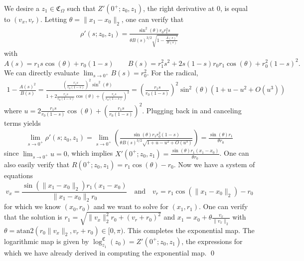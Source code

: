 \documentclass[11pt]{article}
\begin{document}
We desire a $z_1 \in \mathfrak{C}_\Omega$ such that $Z'(0^+; z_0, z_1)$, the right derivative at $0$, is equal to $(v_x, v_r).$ Letting $\theta = \|x_1 - x_0\|_2$, one can verify that 
\begin{align*}
    \rho'(s; z_0, z_1) = \frac{\sin^2(\theta)r_0r_1^2s}{\theta B(s)^{3/2}\sqrt{1 - \frac{A(s)^2}{B(s)}}}
\end{align*}
with 
\begin{equation*}
    A(s) = r_1s\cos(\theta) + r_0(1-s) \qquad B(s) = r_1^2s^2 + 2s(1-s)r_0r_1\cos(\theta) + r_0^2(1-s)^2.
\end{equation*}
We can directly evaluate $\lim_{s \rightarrow 0^+}B(s) = r_0^2$. For the radical,
\begin{align*}
    1 - \frac{A(s)^2}{B(s)} = \frac{\left(\frac{r_1s}{r_0(1-s)}\right)^2\sin^2(\theta)}{1 + 2\frac{r_1s}{r_0(1-s)}\cos(\theta) + \left(\frac{r_1s}{r_0(1-s)}\right)^2} = \left(\frac{r_1s}{r_0(1-s)}\right)^2\sin^2(\theta)\left(1 + u - u^2 + O(u^3)\right)
\end{align*}
where $u = 2\frac{r_1s}{r_0(1-s)}\cos(\theta) + \left(\frac{r_1s}{r_0(1-s)}\right)^2$. Plugging back in and canceling terms yields
\begin{align*}
    \lim_{s \rightarrow 0^+}\rho'(s; z_0, z_1) = \lim_{s\rightarrow 0^+}\left(\frac{\sin(\theta)r_1r_0^2(1-s)}{\theta B(s)^{3/2}\sqrt{1  + u - u^2 + O(u^3)}}\right) = \frac{\sin(\theta)r_1}{\theta r_0}
\end{align*}
since $\lim_{s \rightarrow 0^+}u = 0$, which implies $X'(0^+; z_0, z_1) = \frac{\sin(\theta)r_1(x_1 - x_0)}{\theta r_0}$. One can also easily verify that $R(0^+; z_0, z_1) = r_1\cos(\theta) - r_0$. Now we have a system of equations 
\begin{equation*}
    v_x = \frac{\sin(\|x_1 - x_0\|_2)r_1(x_1 - x_0)}{\|x_1 - x_0\|_2 r_0} \quad \text{and} \quad  v_r = r_1\cos(\|x_1 - x_0\|_2) - r_0
\end{equation*}
for which we know $(x_0, r_0)$ and we want to solve for $(x_1, r_1)$. One can verify that the solution is $r_1 = \sqrt{\|v_x\|_2^2r_0 + (v_r+r_0)^2}$ and $x_1 = x_0 + \theta\frac{v_x}{\|v_x\|_2}$ with $\theta = \text{atan2}(r_0\|v_x\|_2, v_r + r_0) \in [0, \pi)$. This completes the exponential map. The logarithmic map is given by
$\log^{\mathfrak{C}}_{z_1}(z_0) = Z'(0^+; z_0, z_1)$, the expressions for which we have already derived in computing the exponential map.
\qed{}
\end{document}
